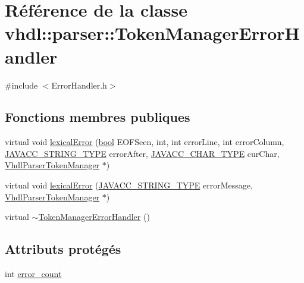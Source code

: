 \hypertarget{classvhdl_1_1parser_1_1_token_manager_error_handler}{}\section{Référence de la classe vhdl\+:\+:parser\+:\+:Token\+Manager\+Error\+Handler}
\label{classvhdl_1_1parser_1_1_token_manager_error_handler}


{\ttfamily \#include $<$Error\+Handler.\+h$>$}

\subsection*{Fonctions membres publiques}
\begin{DoxyCompactItemize}
\item 
virtual void \hyperlink{classvhdl_1_1parser_1_1_token_manager_error_handler_a76904d76d1503ee0755e2df54e1ec7dd}{lexical\+Error} (\hyperlink{qglobal_8h_a1062901a7428fdd9c7f180f5e01ea056}{bool} E\+O\+F\+Seen, int, int error\+Line, int error\+Column, \hyperlink{_java_c_c_8h_a7941da0682a76ffa9869d8458e166062}{J\+A\+V\+A\+C\+C\+\_\+\+S\+T\+R\+I\+N\+G\+\_\+\+T\+Y\+P\+E} error\+After, \hyperlink{_java_c_c_8h_a401fffd20e03e2993f9588187b65afc3}{J\+A\+V\+A\+C\+C\+\_\+\+C\+H\+A\+R\+\_\+\+T\+Y\+P\+E} cur\+Char, \hyperlink{classvhdl_1_1parser_1_1_vhdl_parser_token_manager}{Vhdl\+Parser\+Token\+Manager} $\ast$)
\item 
virtual void \hyperlink{classvhdl_1_1parser_1_1_token_manager_error_handler_aa707fbb7d2d21fe2df653eb6e6e023ba}{lexical\+Error} (\hyperlink{_java_c_c_8h_a7941da0682a76ffa9869d8458e166062}{J\+A\+V\+A\+C\+C\+\_\+\+S\+T\+R\+I\+N\+G\+\_\+\+T\+Y\+P\+E} error\+Message, \hyperlink{classvhdl_1_1parser_1_1_vhdl_parser_token_manager}{Vhdl\+Parser\+Token\+Manager} $\ast$)
\item 
virtual \hyperlink{classvhdl_1_1parser_1_1_token_manager_error_handler_a0afc3cb894583ee40c53a3a5c54495dc}{$\sim$\+Token\+Manager\+Error\+Handler} ()
\end{DoxyCompactItemize}
\subsection*{Attributs protégés}
\begin{DoxyCompactItemize}
\item 
int \hyperlink{classvhdl_1_1parser_1_1_token_manager_error_handler_a6d2fbf9bff5de1775a78dc4872ccdca5}{error\+\_\+count}
\end{DoxyCompactItemize}
